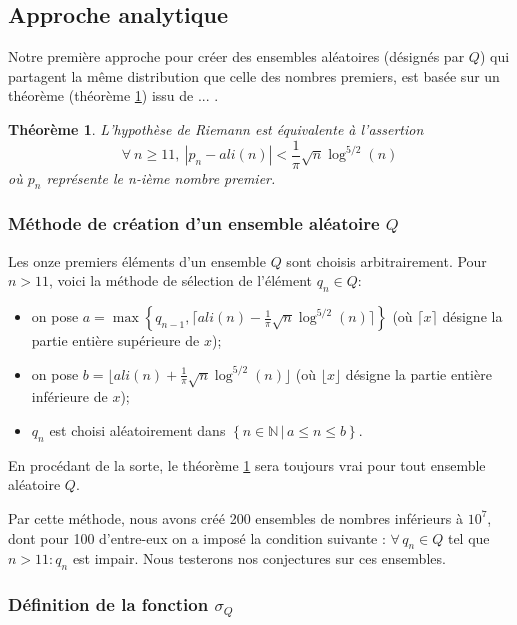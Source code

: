 \documentclass[../main.tex]{report}
\begin{document}
\theoremstyle{plain}
\newtheorem{Thm}{Théorème}

\subsection{Approche analytique}

Notre première approche pour créer des ensembles aléatoires (désignés par $Q$) qui partagent la même distribution que celle des nombres premiers, est basée sur un théorème (théorème \ref{theorem}) issu de ... . 

\begin{Thm}
\label{theorem}
	L'hypothèse de Riemann est équivalente à l'assertion 
	\[
	\forall \ n \geqslant 11, \ |p_{n} - ali(n) | < \frac{1}{\pi} \sqrt{n} \log^{5/2}(n) 
	\]
	où $p_{n}$ représente le n-ième nombre premier.
\end{Thm}

\subsubsection{Méthode de création d'un ensemble aléatoire $Q$}

Les onze premiers éléments d'un ensemble $Q$ sont choisis arbitrairement. 
Pour $ n > 11 $, voici la méthode de sélection  de l'élément $q_{n} \in Q$: 
\begin{itemize}
	\item on pose $ a = \max \left\{ q_{n-1} ,\lceil{ali(n) - \frac{1}{\pi} \sqrt{n} \log^{5/2}(n) \rceil} \right\}$ 
	(où $\lceil x \rceil$ désigne la partie entière supérieure de $x$);
	\item on pose $ b = \lfloor ali(n) + \frac{1}{\pi} \sqrt{n} \log^{5/2}(n) \rfloor $
	(où $\lfloor x \rfloor$ désigne la partie entière inférieure de $x$);
	\item $ q_{n} $ est choisi aléatoirement dans $ \left\{ n\in \mathbb{N} \, | \, a \leqslant n \leqslant b \right\}$. 
\end{itemize}

En procédant de la sorte, le théorème \ref{theorem} sera toujours vrai pour tout ensemble aléatoire $Q$.

Par cette méthode, nous avons créé 200 ensembles de nombres inférieurs à $10^{7}$, dont pour 100 d'entre-eux on a imposé la condition suivante : $\forall \, q_{n} \in Q$ tel que  $n > 11 : q_{n}$ est impair. Nous testerons nos conjectures sur ces ensembles.

\subsubsection{Définition de la fonction $\sigma_{Q}$}
\end{document}
